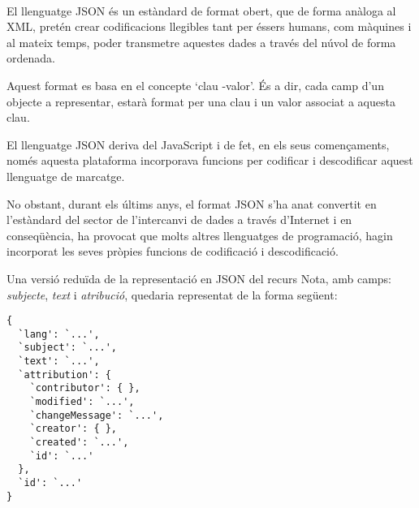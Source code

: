         \paragraph{}
        El llenguatge \gls{JSON} és un estàndard de format obert, que de forma anàloga al XML, pretén crear codificacions llegibles tant per éssers humans, com màquines i al mateix temps, poder transmetre aquestes dades a través del núvol de forma ordenada.

        Aquest format es basa en el concepte `clau -valor'. És a dir, cada camp d'un objecte a representar, estarà format per una clau i un valor associat a aquesta clau.

        El llenguatge JSON deriva del JavaScript i de fet, en els seus començaments, només aquesta plataforma incorporava funcions per codificar i descodificar aquest llenguatge de marcatge.

        No obstant, durant els últims anys, el format JSON s'ha anat convertit en l'estàndard del sector de l'intercanvi de dades a través d'Internet i en conseqüència, ha provocat que molts altres llenguatges de programació, hagin incorporat les seves pròpies funcions de codificació i descodificació.

        Una versió reduïda de la representació en JSON del recurs Nota, amb camps: \emph{subjecte}, \emph{text} i \emph{atribució}, quedaria representat de la forma següent:

        \begin{lstlisting}[style=rawOwn,caption={Representació bàsica en JSON d'una Nota}]
{
  `lang': `...',
  `subject': `...',
  `text': `...',
  `attribution': {
    `contributor': { },
    `modified': `...',
    `changeMessage': `...',
    `creator': { },
    `created': `...',
    `id': `...'
  },
  `id': `...'
}
        \end{lstlisting}

